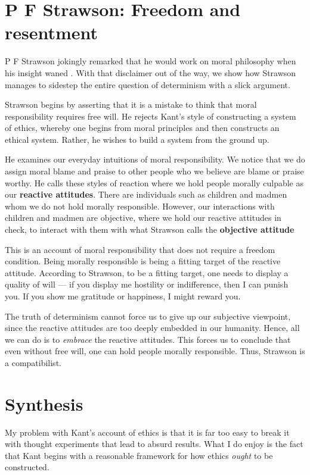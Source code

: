 \documentclass{article}
\begin{document}
\section{P F Strawson: Freedom and resentment}

P F Strawson jokingly remarked that he would work on moral philosophy when his
insight waned \cite{TODO}. With that disclaimer out of the way, we show how
Strawson manages to sidestep the entire question of determinism with a slick
argument.


Strawson begins by asserting that it is a mistake to think that moral responsibility
requires free will. He rejects Kant's style of constructing a system of ethics,
whereby one begins from moral principles and then constructs an ethical system.
Rather, he wishes to build a system from the ground up. 

He examines our everyday intuitions of moral responsibility. We notice that
we do assign moral blame and praise to other people who we believe are blame
or praise worthy. He calls these styles of reaction where we hold people
morally culpable as our \textbf{reactive attitudes}. There are 
individuals such as children and madmen whom we do not hold morally
responsible. However, our interactions with children and madmen are objective,
where we hold our reactive attitudes in check, to interact with them with
what Strawson calls the \textbf{objective attitude}

This is an account of moral responsibility that does not require a freedom
condition. Being morally responsible is being a fitting target of the
reactive attitude. According to Strawson, to be a fitting target, one needs
to display a quality of will --- if you display me hostility or indifference,
then I can punish you. If you show me gratitude or happiness, I might reward
you. 

The truth of determinism cannot force us to give up our subjective viewpoint,
since the reactive attitudes are too deeply embedded in our
humanity. Hence, all we can do is to \emph{embrace} the reactive attitudes.
This forces us to conclude that even without free will, one can hold people
morally responsible. Thus, Strawson is a compatibilist.

\section{Synthesis}

My problem with Kant's account of ethics is that it is far too easy to break
it with thought experiments that lead to absurd results. What I do enjoy
is the fact that Kant begins with a reasonable framework for how ethics
\emph{ought} to be constructed.
\end{document}
